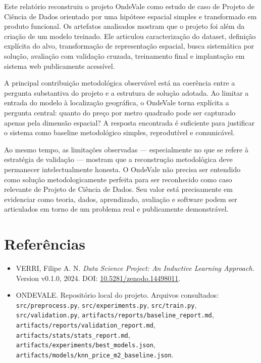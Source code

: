 \documentclass[12pt]{report}
\begin{document}
Este relatório reconstruiu o projeto OndeVale como estudo de caso de Projeto de Ciência de Dados orientado por uma hipótese espacial simples e transformado em produto funcional. Os artefatos analisados mostram que o projeto foi além da criação de um modelo treinado. Ele articulou caracterização do dataset, definição explícita do alvo, transformação de representação espacial, busca sistemática por solução, avaliação com validação cruzada, treinamento final e implantação em sistema web publicamente acessível.

A principal contribuição metodológica observável está na coerência entre a pergunta substantiva do projeto e a estrutura de solução adotada. Ao limitar a entrada do modelo à localização geográfica, o OndeVale torna explícita a pergunta central: quanto do preço por metro quadrado pode ser capturado apenas pela dimensão espacial? A resposta encontrada é suficiente para justificar o sistema como baseline metodológico simples, reprodutível e comunicável.

Ao mesmo tempo, as limitações observadas --- especialmente no que se refere à estratégia de validação --- mostram que a reconstrução metodológica deve permanecer intelectualmente honesta. O OndeVale não precisa ser entendido como solução metodologicamente perfeita para ser reconhecido como caso relevante de Projeto de Ciência de Dados. Seu valor está precisamente em evidenciar como teoria, dados, aprendizado, avaliação e software podem ser articulados em torno de um problema real e publicamente demonstrável.

\chapter{Referências}

\begin{itemize}
    \item VERRI, Filipe A. N. \textit{Data Science Project: An Inductive Learning Approach}. Version v0.1.0, 2024. DOI: \url{10.5281/zenodo.14498011}.
    \item ONDEVALE. Repositório local do projeto. Arquivos consultados: \texttt{src/preprocess.py}, \texttt{src/experiments.py}, \texttt{src/train.py}, \texttt{src/validation.py}, \texttt{artifacts/reports/baseline\_report.md}, \texttt{artifacts/reports/validation\_report.md}, \texttt{artifacts/stats/stats\_report.md}, \texttt{artifacts/experiments/best\_models.json}, \texttt{artifacts/models/knn\_price\_m2\_baseline.json}.
\end{itemize}
\end{document}
